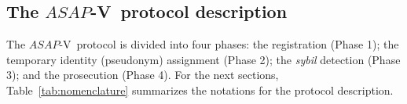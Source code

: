 \documentclass[preprint,12pt]{elsarticle}
\newcommand{\protocolname}{$ASAP$-V}
\begin{document}
\subsection{The \protocolname~protocol description}


The \protocolname~protocol is divided into four phases: the registration (Phase 1); the temporary identity (pseudonym) assignment (Phase 2); the \textit{sybil} detection (Phase 3); and the prosecution (Phase 4). For the next sections, Table~\ref{tab:nomenclature} summarizes the notations for the protocol description.
\end{document}
